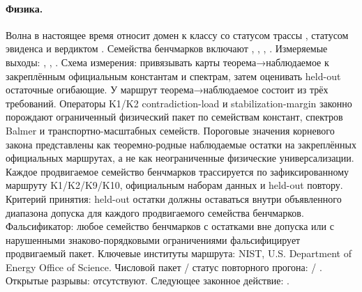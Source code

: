 \paragraph{Физика.}
Волна  в настоящее время относит домен к классу  со статусом трассы , статусом эвиденса  и вердиктом .
Семейства бенчмарков включают , \allowbreak {}, \allowbreak {}, \allowbreak {}.
Измеряемые выходы: , \allowbreak {}, \allowbreak {}.
Схема измерения: привязывать карты теорема→наблюдаемое к закреплённым официальным константам и спектрам, затем оценивать held-out остаточные огибающие.
У маршрут теорема→наблюдаемое состоит из трёх требований. Операторы K1/K2 contradiction-load и stabilization-margin законно порождают ограниченный физический пакет по семействам констант, спектров Balmer и транспортно-масштабных семейств. Пороговые значения корневого закона представлены как теоремно-родные наблюдаемые остатки на закреплённых официальных маршрутах, а не как неограниченные физические универсализации. Каждое продвигаемое семейство бенчмарков трассируется по зафиксированному маршруту K1/K2/K9/K10, официальным наборам данных и held-out повтору.
Критерий принятия: held-out остатки должны оставаться внутри объявленного диапазона допуска для каждого продвигаемого семейства бенчмарков.
Фальсификатор: любое семейство бенчмарков с остатками вне допуска или с нарушенными знаково-порядковыми ограничениями фальсифицирует продвигаемый пакет.
Ключевые институты маршрута: NIST, \allowbreak U.S. Department of Energy Office of Science.
Числовой пакет / статус повторного прогона:  / .
Открытые разрывы: отсутствуют.
Следующее законное действие: .

